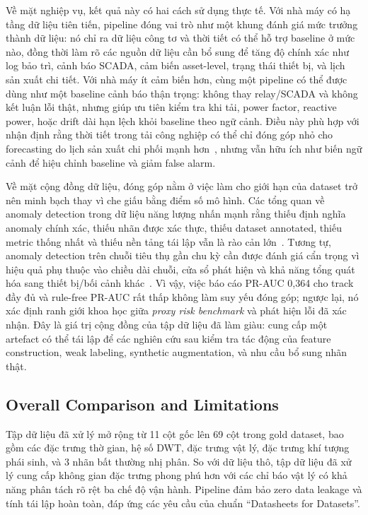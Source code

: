 Về mặt nghiệp vụ, kết quả này có hai cách sử dụng thực tế. Với nhà máy có hạ tầng dữ liệu tiên tiến, pipeline đóng vai trò như một khung đánh giá mức trưởng thành dữ liệu: nó chỉ ra dữ liệu công tơ và thời tiết có thể hỗ trợ baseline ở mức nào, đồng thời làm rõ các nguồn dữ liệu cần bổ sung để tăng độ chính xác như log bảo trì, cảnh báo SCADA, cảm biến asset-level, trạng thái thiết bị, và lịch sản xuất chi tiết. Với nhà máy ít cảm biến hơn, cùng một pipeline có thể được dùng như một baseline cảnh báo thận trọng: không thay relay/SCADA và không kết luận lỗi thật, nhưng giúp ưu tiên kiểm tra khi tải, power factor, reactive power, hoặc drift dài hạn lệch khỏi baseline theo ngữ cảnh. Điều này phù hợp với nhận định rằng thời tiết trong tải công nghiệp có thể chỉ đóng góp nhỏ cho forecasting do lịch sản xuất chi phối mạnh hơn~\cite{gekeler2025weather}, nhưng vẫn hữu ích như biến ngữ cảnh để hiệu chỉnh baseline và giảm false alarm.

Về mặt cộng đồng dữ liệu, đóng góp nằm ở việc làm cho giới hạn của dataset trở nên minh bạch thay vì che giấu bằng điểm số mô hình. Các tổng quan về anomaly detection trong dữ liệu năng lượng nhấn mạnh rằng thiếu định nghĩa anomaly chính xác, thiếu nhãn được xác thực, thiếu dataset annotated, thiếu metric thống nhất và thiếu nền tảng tái lập vẫn là rào cản lớn~\cite{himeur2021review}. Tương tự, anomaly detection trên chuỗi tiêu thụ gần chu kỳ cần được đánh giá cẩn trọng vì hiệu quả phụ thuộc vào chiều dài chuỗi, cửa sổ phát hiện và khả năng tổng quát hóa sang thiết bị/bối cảnh khác~\cite{zangrando2022quasi}. Vì vậy, việc báo cáo PR-AUC 0,364 cho track đầy đủ và rule-free PR-AUC rất thấp không làm suy yếu đóng góp; ngược lại, nó xác định ranh giới khoa học giữa \textit{proxy risk benchmark} và phát hiện lỗi đã xác nhận. Đây là giá trị cộng đồng của tập dữ liệu đã làm giàu: cung cấp một artefact có thể tái lập để các nghiên cứu sau kiểm tra tác động của feature construction, weak labeling, synthetic augmentation, và nhu cầu bổ sung nhãn thật.

\subsection{Overall Comparison and Limitations}

Tập dữ liệu đã xử lý mở rộng từ 11 cột gốc lên 69 cột trong gold dataset,
bao gồm các đặc trưng thờ gian, hệ số DWT, đặc trưng vật lý, đặc trưng khí tượng phái sinh,
và 3 nhãn bất thường nhị phân.
So với dữ liệu thô, tập dữ liệu đã xử lý cung cấp không gian đặc trưng phong phú hơn
với các chỉ báo vật lý có khả năng phân tách rõ rệt ba chế độ vận hành.
Pipeline đảm bảo zero data leakage và tính tái lập hoàn toàn,
đáp ứng các yêu cầu của chuẩn ``Datasheets for Datasets''.

